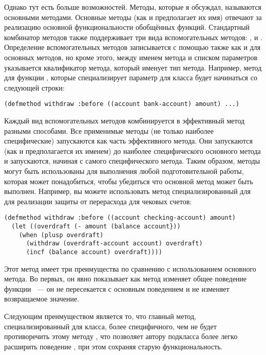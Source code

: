Однако тут есть больше возможностей.  Методы, которые я обсуждал, называются основными
методами.  Основные методы (как и предполагает их имя) отвечают за реализацию основной
функциональности обобщённых функций.  Стандартный комбинатор методов также поддерживает
три вида вспомогательных методов: ,  и .
Определение вспомогательных методов записывается с помощью  также как и
для основных методов, но кроме этого, между именем метода и списком параметров указывается
квалификатор метода, который именует тип метода.  Например, метод  для
функции , которые специализирует параметр  для класса
 будет начинаться со следующей строки:

\begin{lstlisting}
(defmethod withdraw :before ((account bank-account) amount) ...)
\end{lstlisting}

Каждый вид вспомогательных методов комбинируется в эффективный метод разными способами.
Все применимые методы  (не только наиболее специфические) запускаются как
часть эффективного метода.  Они запускаются (как и предполагается их именем) до наиболее
специфического основного метода и запускаются, начиная с самого специфического метода.
Таким образом, методы  могут быть использованы для выполнения любой
подготовительной работы, которая может понадобиться, чтобы убедиться что основной метод
может быть выполнен.  Например, вы можете использовать метод 
специализированный для  для реализации защиты от перерасхода для
чековых счетов:

\begin{lstlisting}
(defmethod withdraw :before ((account checking-account) amount)
  (let ((overdraft (- amount (balance account}))
    (when (plusp overdraft)
      (withdraw (overdraft-account account) overdraft)
      (incf (balance account) overdraft))))
\end{lstlisting}

Этот метод  имеет три преимущества по сравнению с использованием основного
метода.  Во первых, он явно показывает как метод изменяет общее поведение функции
~--- он не пересекается с основным поведением и не изменяет возвращаемое
значение.

Следующим преимуществом является то, что главный метод, специализированный для класса,
более специфичного, чем  не будет противоречить этому методу
, что позволяет автору подкласса  более легко
расширить поведение , при этом сохраняя старую функциональность.

